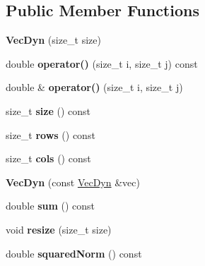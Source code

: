 \subsection*{Public Member Functions}
\begin{DoxyCompactItemize}
\item 
\mbox{\label{classraisim_1_1VecDyn_a2acf2a4e837f74ee280a915b69d597d0}} 
{\bfseries Vec\+Dyn} (size\+\_\+t size)
\item 
\mbox{\label{classraisim_1_1VecDyn_a3134befe67c7e7ba5869891c09fbaf4d}} 
double {\bfseries operator()} (size\+\_\+t i, size\+\_\+t j) const
\item 
\mbox{\label{classraisim_1_1VecDyn_a9a93caef3128a524fb5b00c3277de3be}} 
double \& {\bfseries operator()} (size\+\_\+t i, size\+\_\+t j)
\item 
\mbox{\label{classraisim_1_1VecDyn_a2fa2824b3702963cd73d1ec0e0267235}} 
size\+\_\+t {\bfseries size} () const
\item 
\mbox{\label{classraisim_1_1VecDyn_a8fb9cc2e4e56f76bd83545af6857922c}} 
size\+\_\+t {\bfseries rows} () const
\item 
\mbox{\label{classraisim_1_1VecDyn_ad8fc8ab9f74baef86d5237644ed086e0}} 
size\+\_\+t {\bfseries cols} () const
\item 
\mbox{\label{classraisim_1_1VecDyn_ab88fc886d59e026129bf27018acfc866}} 
{\bfseries Vec\+Dyn} (const \hyperlink{classraisim_1_1VecDyn}{Vec\+Dyn} \&vec)
\item 
\mbox{\label{classraisim_1_1VecDyn_aa3c210b3bba1ae109e7293439f4e2e74}} 
double {\bfseries sum} () const
\item 
\mbox{\label{classraisim_1_1VecDyn_aecc1bd0378537044daafcc13162db6a0}} 
void {\bfseries resize} (size\+\_\+t size)
\item 
\mbox{\label{classraisim_1_1VecDyn_a27ba5748810c71f73e1e6335d8310c2e}} 
double {\bfseries squared\+Norm} () const

\end{DoxyCompactItemize}
